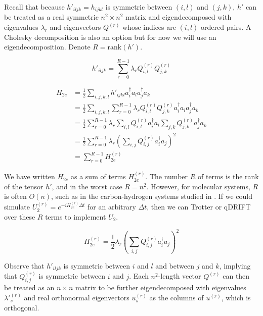 Recall that because $h'_{iljk} = h_{ijkl}$ is symmetric between $(i, l)$ and $(j, k)$, $h'$ can be treated as a real symmetric $n^2 \times n^2$ matrix and eigendecomposed with eigenvalues $\lambda_r$ and eigenvectors $Q^{(r)}$ whose indices are $(i, l)$ ordered pairs. A Cholesky decomposition is also an option but for now we will use an eigendecomposition. Denote $R = \text{rank}{(h')}$.

\begin{equation}
    h'_{iljk} = \sum_{r = 0}^{R - 1} \lambda_r Q^{(r)}_{i, l}Q^{(r)}_{j, k}
\end{equation}

\begin{equation}
    \begin{split}
        H_{2e} &= \frac{1}{2}\sum_{i,j,k,l} h'_{ijkl}a^\dag_ia_la^\dag_ja_k \\
        &= \frac{1}{2}\sum_{i,j,k,l} \sum_{r = 0}^{R - 1} \lambda_r Q^{(r)}_{i, l}Q^{(r)}_{j, k}a^\dag_ia_la^\dag_ja_k \\
        &= \frac{1}{2}\sum_{r = 0}^{R - 1} \lambda_r \sum_{i,l} Q^{(r)}_{i, l}a^\dag_ia_l\sum_{j,k}Q^{(r)}_{j, k}a^\dag_ja_k \\
        &= \frac{1}{2}\sum_{r = 0}^{R - 1}\lambda_r\left(\sum_{i,j} Q^{(r)}_{i, j}a^\dag_ia_j\right)^2 \\
        &= \sum_{r = 0}^{R - 1} H_{2e}^{(r)}
    \end{split}
    \label{eq: DF}
\end{equation}

We have written $H_{2e}$ as a sum of terms $H_{2e}^{(r)}$. The number $R$ of terms is the rank of the tensor $h'$, and in the worst case $R = n^2$. However, for molecular systems, $R$ is often $O(n)$, such as in the carbon-hydrogen systems studied in \cite{CH}. If we could simulate $U_2^{(r)} = e^{-iH_{2e}^{(r)}\Delta t}$ for an arbitrary $\Delta t$, then we can Trotter or qDRIFT over these $R$ terms to implement $U_2$.

\begin{equation}
    H_{2e}^{(r)} = \frac{1}{2}\lambda_r\left(\sum_{i,j} Q^{(r)}_{i, j}a^\dag_ia_j\right)^2
\end{equation}

Observe that $h'_{iljk}$ is symmetric between $i$ and $l$ and between $j$ and $k$, implying that $Q^{(r)}_{i, j}$ is symmetric between $i$ and $j$. Each $n^2$-length vector $Q^{(r)}$ can then be treated as an $n \times n$ matrix to be further eigendecomposed with eigenvalues $\lambda'^{(r)}_s$ and real orthonormal eigenvectors $u^{(r)}_s$ as the columns of $u^{(r)}$, which is orthogonal.

